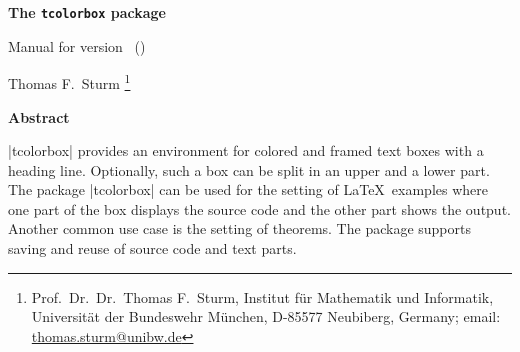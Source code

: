 \begin{center}
\vspace*{5mm}\par
{\bfseries\LARGE The \texttt{tcolorbox} package\par}
{\large Manual for version \version\ (\datum)\par}\bigskip
{\large Thomas F.~Sturm%
  \footnote{Prof.~Dr.~Dr.~Thomas F.~Sturm, Institut f\"{u}r Mathematik und Informatik,
    Universit\"{a}t der Bundeswehr M\"{u}nchen, D-85577 Neubiberg, Germany;
     email: \href{mailto:thomas.sturm@unibw.de}{thomas.sturm@unibw.de}} }
\end{center}
\bigskip
\begin{absquote}
  \begin{center}\bfseries Abstract\end{center}
  |tcolorbox| provides an environment for colored and framed text boxes with a
  heading line. Optionally, such a box can be split in an upper and a lower
  part. The package |tcolorbox| can be used for the setting of \LaTeX\ examples where
  one part of the box displays the source code and the other part shows the
  output. Another common use case is the setting of theorems. The package supports
  saving and reuse of source code and text parts.
\end{absquote}

\begin{tcolorbox}[breakable,enhanced,title={Contents},fonttitle=\bfseries\Large,
  colback=yellow!10!white,colframe=red!50!black,before=\par\bigskip\noindent,
  watermark color=yellow!75!red!25!white,pad at break=3mm,
  watermark text={\bfseries\Large Contents},
  drop fuzzy shadow]
\makeatletter
{}
\makeatother
\end{tcolorbox}
